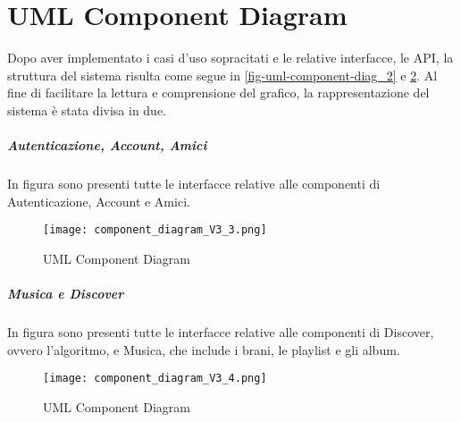 \section{UML Component Diagram}
Dopo aver implementato i casi d'uso sopracitati e le relative interfacce, le API, la struttura del 
sistema risulta come segue in \ref{fig-uml-component-diag_2} e \ref{fig-uml-component-diag_4}. Al fine di
facilitare la lettura e comprensione del grafico, la rappresentazione del sistema è stata divisa in due. 
\subparagraph{Autenticazione, Account, Amici} In figura sono presenti tutte le interfacce
relative alle componenti di Autenticazione, Account e Amici.
\begin{figure}[H]
    \centering
    \texttt{[image: component\_diagram\_V3\_3.png]}
    \caption{UML Component Diagram}
    \label{fig-uml-component-diag_3}
\end{figure}

\newpage
\subparagraph{Musica e Discover}  In figura sono presenti tutte le interfacce
relative alle componenti di Discover, ovvero l'algoritmo, e Musica, che include i brani, le playlist e gli album.
\begin{figure}[H]
    \centering
    \texttt{[image: component\_diagram\_V3\_4.png]}
    \caption{UML Component Diagram}
    \label{fig-uml-component-diag_4}
\end{figure}

